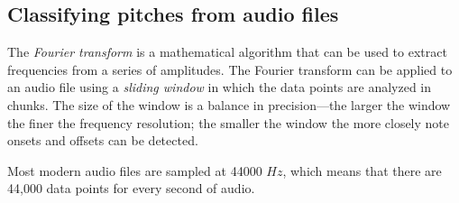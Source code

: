 \subsection{Classifying pitches from audio files}

The \textit{Fourier transform} is a mathematical algorithm that can be used to extract frequencies from a series of amplitudes. The Fourier transform can be applied to an audio file using a \textit{sliding window} in which the data points are analyzed in chunks. The size of the window is a balance in precision---the larger the window the finer the frequency resolution; the smaller the window the more closely note onsets and offsets can be detected.

Most modern audio files are sampled at 44000 $Hz$, which means that there are 44,000 data points for every second of audio.